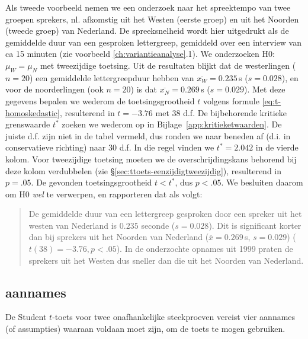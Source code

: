 \documentclass[
]{book}
\begin{document}
Als tweede voorbeeld nemen we een onderzoek naar het spreektempo van
twee groepen sprekers, nl. afkomstig uit het Westen (eerste groep) en
uit het Noorden (tweede groep) van Nederland. De spreeksnelheid wordt
hier uitgedrukt als de gemiddelde duur van een gesproken lettergreep,
gemiddeld over een interview van ca 15 minuten (zie voorbeeld \ref{ch:variantieanalyse}.1).
We onderzoeken H0: \(\mu_W = \mu_N\) met
tweezijdige toetsing. Uit de resultaten blijkt dat de westerlingen
(\(n=20\)) een gemiddelde lettergreepduur hebben van
\(\overline{x_W}=0.235\) s (\(s=0.028\)), en voor de noorderlingen (ook
\(n=20\)) is dat \(\overline{x_N}=0.269\) s (\(s=0.029\)). Met deze gegevens
bepalen we wederom de toetsingsgrootheid \(t\) volgens formule
\eqref{eq:t-homoskedastic}, resulterend in \(t=-3.76\) met 38 d.f. De
bijbehorende kritieke grenswaarde \(t^*\) zoeken we wederom op in
Bijlage~\ref{app:kritieketwaarden}. De juiste d.f. zijn niet in de tabel
vermeld, dus ronden we naar beneden af (d.i. in conservatieve richting)
naar 30 d.f. In die regel vinden we \(t^*=2.042\) in de vierde kolom. Voor
tweezijdige toetsing moeten we de overschrijdingskans behorend bij deze
kolom verdubbelen (zie
§\ref{sec:ttoets-eenzijdigtweezijdig}), resulterend in \(p=.05\). De
gevonden toetsingsgrootheid \(t < t^*\), dus \(p<.05\). We besluiten daarom
om H0 \emph{wel} te verwerpen, en rapporteren dat als volgt:

\begin{quote}
De gemiddelde duur van een lettergreep gesproken door een spreker uit
het westen van Nederland is \(0.235\) seconde (\(s=0.028\)). Dit is
significant korter dan bij sprekers uit het Noorden van Nederland
(\(\overline{x}=0.269\) s, \(s=0.029\)) (\(t(38)=-3.76, p<.05\)). In de
onderzochte opnames uit 1999 praten de sprekers uit het Westen dus
sneller dan die uit het Noorden van Nederland.
\end{quote}

\hypertarget{sec:ttoets-ongepaard-aannames}{%
\subsection{aannames}\label{sec:ttoets-ongepaard-aannames}}

De Student \(t\)-toets voor twee onafhankelijke steekproeven vereist vier aannames
(of assumpties) waaraan voldaan moet zijn, om de toets te mogen
gebruiken.
\end{document}
